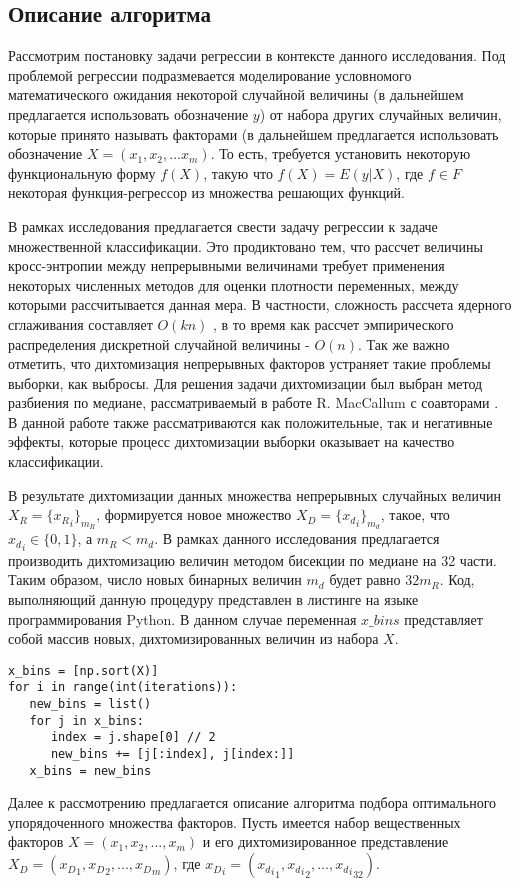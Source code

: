 \documentclass[runningheads]{llncs}
\begin{document}
\subsection{Описание алгоритма}
Рассмотрим постановку задачи регрессии в контексте данного исследования. Под проблемой регрессии подразмевается моделирование условномого математического ожидания некоторой случайной величины (в дальнейшем предлагается использовать обозначение $y$) от набора других случайных величин, которые принято называть факторами (в дальнейшем предлагается использовать обозначение $X = (x_1, x_2, ... x_m)$. То есть, требуется установить некоторую функциональную форму $f(X)$, такую что $f(X) = E(y|X)$, где $f \in F$ некоторая функция-регрессор из множества решающих функций.
\par
В рамках исследования предлагается свести задачу регрессии к задаче множественной классификации. Это продиктовано тем, что рассчет величины кросс-энтропии между непрерывными величинами требует применения некоторых численных методов для оценки плотности переменных, между которыми рассчитывается данная мера. В частности, сложность рассчета ядерного сглаживания составляет $O(kn)$ \cite{raykar2010fast}, в то время как рассчет эмпирического распределения дискретной случайной величины - $O(n)$. Так же важно отметить, что дихтомизация непрерывных факторов устраняет такие проблемы выборки, как выбросы. Для решения задачи дихтомизации был выбран метод разбиения по медиане, рассматриваемый в работе R. MacCallum с соавторами \cite{maccallum2002practice}. В данной работе также рассматриваются как положительные, так и негативные эффекты, которые процесс дихтомизации выборки оказывает на качество классификации.
\par
В результате дихтомизации данных множества непрерывных случайных величин $X_R = \{{x_{R}}_i\}_{m_{R}}$, формируется новое множество $X_D = \{{x_{d}}_i\}_{m_{d}}$, такое, что ${x_{d}}_i \in \{0, 1\}$, а ${m_{R}} < {m_{d}}$. В рамках данного исследования предлагается производить дихтомизацию величин методом бисекции по медиане на 32 части. Таким образом, число новых бинарных величин ${m_{d}}$ будет равно $32{m_{R}}$. Код, выполняющий данную процедуру представлен в листинге на языке программирования Python. В данном случае переменная $x\_bins$ представляет собой массив новых, дихтомизированных величин из набора $X$.
\begin{lstlisting}
x_bins = [np.sort(X)]
for i in range(int(iterations)):
   new_bins = list()
   for j in x_bins:
      index = j.shape[0] // 2
      new_bins += [j[:index], j[index:]]
   x_bins = new_bins
\end{lstlisting}
\par
Далее к рассмотрению предлагается описание алгоритма подбора оптимального упорядоченного множества факторов. Пусть имеется набор вещественных факторов $X = (x_1, x_2, ..., x_m)$ и его дихтомизированное представление $X_D = ({x_D}_1, {x_D}_2, ..., {x_D}_m)$, где ${x_D}_i = ({{x_d}_i}_1, {{x_d}_i}_2, ..., {{x_d}_i}_{32})$. 
\end{document}
